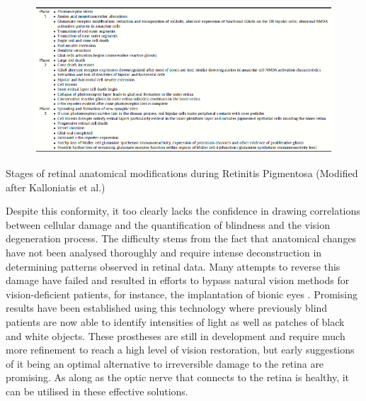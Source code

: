 \documentclass[a4paper]{article}
\begin{document}
        \begin{figure}[h!]
            \centerline{\includegraphics[width=1\textwidth]{../img/damageStages.png}}
            \label{fig 1: Retinal Anatomical Modification} 
        \end{figure}
        \label{fig1:}Stages of retinal anatomical modifications during Retinitis Pigmentosa (Modified after Kalloniatis et al.\cite{RN9})
        \vspace{3mm}
 
        Despite this conformity, it too clearly lacks the confidence in drawing correlations between cellular damage and the quantification of blindness and the vision degeneration process. The difficulty stems from the fact that anatomical changes have not been analysed thoroughly and require intense deconstruction in determining patterns observed in retinal data. Many attempts to reverse this damage have failed and resulted in efforts to bypass natural vision methods for vision-deficient patients, for instance, the implantation of bionic eyes \cite{RN24}. Promising results have been established using this technology where previously blind patients are now able to identify intensities of light as well as patches of black and white objects. These prostheses are still in development and require much more refinement to reach a high level of vision restoration, but early suggestions of it being an optimal alternative to irreversible damage to the retina are promising. As along as the optic nerve that connects to the retina is healthy, it can be utilised in these effective solutions.
        \vspace{3mm}
\end{document}
